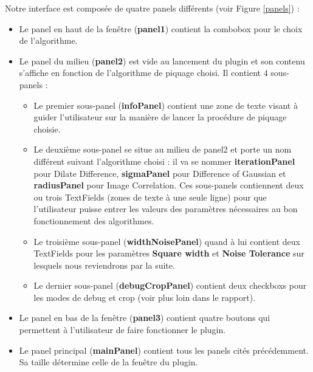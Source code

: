 \documentclass[12pt,a4paper]{report}
\begin{document}
Notre interface est composée de quatre panels différents (voir Figure \ref{panels}) :
\begin{itemize}

\item Le panel en haut de la fenêtre (\textbf{panel1}) contient la combobox pour le choix de l'algorithme. 
\item Le panel du milieu (\textbf{panel2}) est vide au lancement du plugin et son contenu s'affiche en fonction de l'algorithme de piquage choisi. Il contient 4 sous-panels :
\begin{itemize}
\item Le premier sous-panel (\textbf{infoPanel}) contient une zone de texte visant à guider l'utilisateur sur la manière de lancer la procédure de piquage choisie. 
\item Le deuxième sous-panel se situe au milieu de panel2 et porte un nom différent suivant l'algorithme choisi : il va se nommer \textbf{iterationPanel} pour Dilate Difference, \textbf{sigmaPanel} pour Difference of Gaussian et \textbf{radiusPanel} pour Image Correlation. Ces sous-panels contiennent deux ou trois TextFields (zones de texte à une seule ligne) pour que l'utilisateur puisse entrer les valeurs des paramètres nécessaires au bon fonctionnement des algorithmes. 
\item Le troisième sous-panel (\textbf{widthNoisePanel}) quand à lui contient deux TextFields pour les paramètres \textbf{Square width} et \textbf{Noise Tolerance} sur lesquels nous reviendrons par la suite. 
\item Le dernier sous-panel (\textbf{debugCropPanel}) contient deux checkboxs pour les modes de debug et crop (voir plus loin dans le rapport). 
\end{itemize}
\item Le panel en bas de la fenêtre (\textbf{panel3}) contient quatre boutons qui permettent à l'utilisateur de faire fonctionner le plugin. 
\item Le panel principal (\textbf{mainPanel}) contient tous les panels cités précédemment. Sa taille détermine celle de la fenêtre du plugin. 
\end{itemize}
\end{document}

